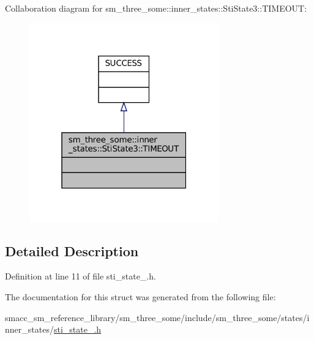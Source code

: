 Collaboration diagram for sm\+\_\+three\+\_\+some\+:\+:inner\+\_\+states\+:\+:Sti\+State3\+:\+:T\+I\+M\+E\+O\+UT\+:
\nopagebreak
\begin{figure}[H]
\begin{center}
\leavevmode
\includegraphics[width=232pt]{structsm__three__some_1_1inner__states_1_1StiState3_1_1TIMEOUT__coll__graph}
\end{center}
\end{figure}


\subsection{Detailed Description}


Definition at line 11 of file sti\+\_\+state\+\_.\+h.



The documentation for this struct was generated from the following file\+:\begin{DoxyCompactItemize}
\item 
smacc\+\_\+sm\+\_\+reference\+\_\+library/sm\+\_\+three\+\_\+some/include/sm\+\_\+three\+\_\+some/states/inner\+\_\+states/\hyperlink{sti__state__3_8h}{sti\+\_\+state\+\_.\+h}\end{DoxyCompactItemize}

